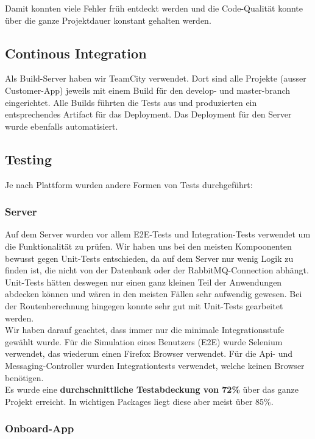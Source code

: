 Damit konnten viele Fehler früh entdeckt werden und die Code-Qualität konnte über die ganze Projektdauer konstant gehalten werden.

\subsection{Continous Integration}

Als Build-Server haben wir TeamCity verwendet. Dort sind alle Projekte (ausser Customer-App) jeweils mit einem Build für den develop- und master-branch eingerichtet. Alle Builds führten die Tests aus und produzierten ein entsprechendes Artifact für das Deployment. Das Deployment für den Server wurde ebenfalls automatisiert.

\subsection{Testing}

Je nach Plattform wurden andere Formen von Tests durchgeführt:

\subsubsection{Server}

Auf dem Server wurden vor allem \Gls{E2E-Test}s und \Gls{Integration-Test}s verwendet um die Funktionalität zu prüfen. Wir haben uns bei den meisten Kompoonenten bewusst gegen \Gls{Unit-Tests} entschieden, da auf dem Server nur wenig Logik zu finden ist, die nicht von der Datenbank oder der RabbitMQ-Connection abhängt. Unit-Tests hätten deswegen nur einen ganz kleinen Teil der Anwendungen abdecken können und wären in den meisten Fällen sehr aufwendig gewesen. Bei der Routenberechnung hingegen konnte sehr gut mit Unit-Tests gearbeitet werden.\\

Wir haben darauf geachtet, dass immer nur die minimale Integrationsstufe gewählt wurde. Für die Simulation eines Benutzers (E2E) wurde Selenium verwendet, das wiederum einen Firefox Browser verwendet. Für die Api- und Messaging-Controller wurden Integrationtests verwendet, welche keinen Browser benötigen.\\

Es wurde eine \textbf{durchschnittliche Testabdeckung von 72\%} über das ganze Projekt erreicht. In wichtigen Packages liegt diese aber meist über 85\%.

\subsubsection{Onboard-App}

